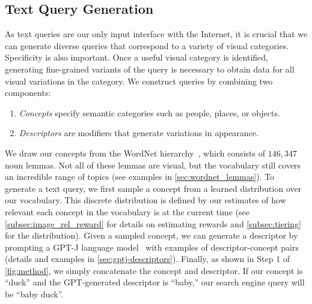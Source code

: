 \subsection{Text Query Generation}
\label{subsec:text_query_generation}
As text queries are our only input interface with the Internet, it is crucial that we can generate diverse queries that correspond to a variety of visual categories. Specificity is also important. Once a useful visual category is identified, generating fine-grained variants of the query is necessary to obtain data for all visual variations in the category.
We construct queries by combining two components: 
\begin{enumerate}[noitemsep,topsep=0pt]
    \item \textit{Concepts} specify semantic categories such as people, places, or objects. %
    \item \textit{Descriptors} are modifiers that generate variations in appearance. %
\end{enumerate}

We draw our concepts from the WordNet hierarchy~\cite{miller1995wordnet}, which consists of $146{,}347$ noun lemmas. Not all of these lemmas are visual, but the vocabulary still covers an incredible range of topics (see examples in \cref{sec:wordnet_lemmas}).
To generate a text query, we first sample a concept from a learned distribution over our vocabulary. This discrete distribution is defined by our estimates of how relevant each concept in the vocabulary is at the current time (see \cref{subsec:image_rel_reward} for details on estimating rewards and \cref{subsec:tiering} for the distribution).
Given a sampled concept, we can generate a descriptor by prompting a GPT-J language model~\cite{gpt-j} with examples of descriptor-concept pairs (details and examples in \cref{sec:gptj-descriptors}).
Finally, as shown in Step 1 of \cref{fig:method}, we simply concatenate the concept and descriptor. If our concept is ``duck'' and the GPT-generated descriptor is ``baby,'' our search engine query will be ``baby duck''.


